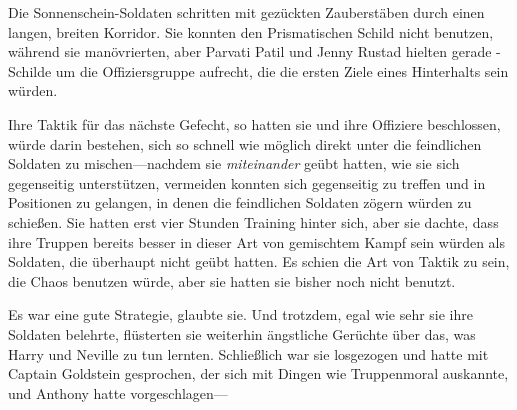 \later

Die Sonnenschein-Soldaten schritten mit gezückten Zauberstäben durch einen langen, breiten Korridor. Sie konnten den Prismatischen Schild nicht benutzen, während sie manövrierten, aber Parvati Patil und Jenny Rustad hielten gerade -Schilde um die Offiziersgruppe aufrecht, die die ersten Ziele eines Hinterhalts sein würden.

Ihre Taktik für das nächste Gefecht, so hatten sie und ihre Offiziere beschlossen, würde darin bestehen, sich so schnell wie möglich direkt unter die feindlichen Soldaten zu mischen—nachdem sie \emph{miteinander} geübt hatten, wie sie sich gegenseitig unterstützen, vermeiden konnten sich gegenseitig zu treffen und in Positionen zu gelangen, in denen die feindlichen Soldaten zögern würden zu schießen. Sie hatten erst vier Stunden Training hinter sich, aber sie dachte, dass ihre Truppen bereits besser in dieser Art von gemischtem Kampf sein würden als Soldaten, die überhaupt nicht geübt hatten. Es schien die Art von Taktik zu sein, die Chaos benutzen würde, aber sie hatten sie bisher noch nicht benutzt.

Es war eine gute Strategie, glaubte sie. Und trotzdem, egal wie sehr sie ihre Soldaten belehrte, flüsterten sie weiterhin ängstliche Gerüchte über das, was Harry und Neville zu tun lernten. Schließlich war sie losgezogen und hatte mit Captain Goldstein gesprochen, der sich mit Dingen wie Truppenmoral auskannte, und Anthony hatte vorgeschlagen—

